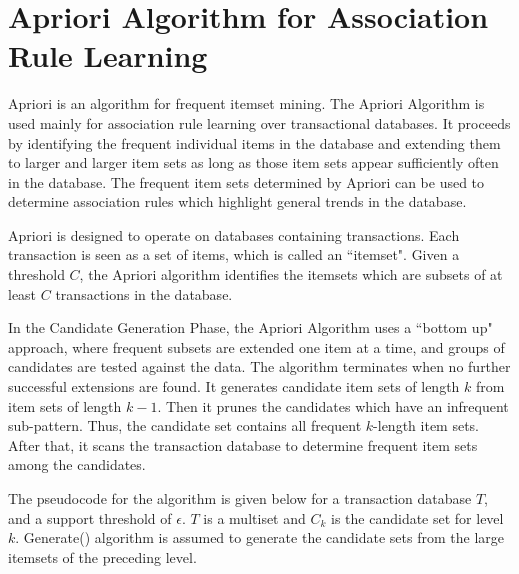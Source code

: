 \section{Apriori Algorithm for Association Rule Learning}
Apriori is an algorithm for frequent itemset mining. The Apriori Algorithm is used mainly for association rule learning over transactional databases. It proceeds by identifying the frequent individual items in the database and extending them to larger and larger item sets as long as those item sets appear sufficiently often in the database. The frequent item sets determined by Apriori can be used to determine association rules which highlight general trends in the database.

Apriori is designed to operate on databases containing transactions. Each transaction is seen as a set of items, which is called an ``itemset". Given a threshold \begin{math}C\end{math}, the Apriori algorithm identifies the itemsets which are subsets of at least \begin{math}C\end{math} transactions in the database. 

In the Candidate Generation  Phase, the Apriori Algorithm uses a ``bottom up" approach, where frequent subsets are extended one item at a time, and groups of candidates are tested against the data. The algorithm terminates when no further successful extensions are found.
It generates candidate item sets of length \begin{math}k\end{math} from item sets of length \begin{math}k-1\end{math}.  Then it prunes the candidates which have an infrequent sub-pattern. Thus, the candidate set contains all frequent \begin{math}k\end{math}-length item sets. After that, it scans the transaction database to determine frequent item sets among the candidates.  

The pseudocode for the algorithm is given below for a transaction database \begin{math}T\end{math}, and a support threshold of \begin{math}\epsilon\end{math}. \begin{math}T\end{math} is a multiset and \begin{math}C_k\end{math} is the candidate set for level \begin{math}k\end{math}.  Generate() algorithm is assumed to generate the candidate sets from the large itemsets of the preceding level.

